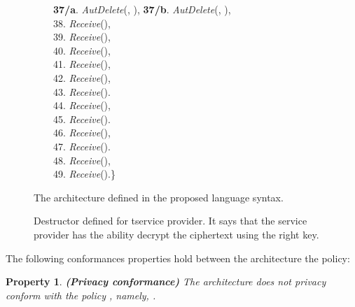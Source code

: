 \documentclass[a4paper]{article}
\newtheorem{ttp}{Property}
\begin{document}
\begin{figure}[htbp]
{\begin{minipage}{15.87 cm}
\begin{tabbing}
\ \ \ \ \textbf{37/a}. \textit{AutDelete}(, ), \textbf{37/b}. \textit{AutDelete}(, ),\\
\ \ \ \ 38. \textit{Receive}(),\\ 
\ \ \ \ 39. \textit{Receive}(),\\  
\ \ \ \ 40. \textit{Receive}(),\\
\ \ \ \ 41. \textit{Receive}(),\\
\ \ \ \ 42. \textit{Receive}(),\\  
\ \ \ \ 43. \textit{Receive}().\\  
\ \ \ \ 44. \textit{Receive}(),\\  
\ \ \ \ 45. \textit{Receive}().\\ 
\ \ \ \ 46. \textit{Receive}(),\\  
\ \ \ \ 47. \textit{Receive}().\\  
\ \ \ \ 48. \textit{Receive}(),\\  
\ \ \ \ 49. \textit{Receive}().\}  
\end{tabbing}
\end{minipage}
}
\caption{The architecture defined in the proposed language syntax.}\label{fig:smartarch1}
\end{figure}

\begin{figure}[htbp]
\centering
{}
\caption{Destructor defined for tservice provider. It says that the service provider has the ability decrypt the ciphertext using the right key.}\label{fig:Destructor}
\end{figure}
 
The following conformances properties hold between the architecture the policy: 

\begin{ttp} \textbf{(Privacy conformance)}
\label{propprivconf}
The architecture  does \textit{not privacy conform} with the policy , namely,   .   
\end{ttp}
\end{document}
